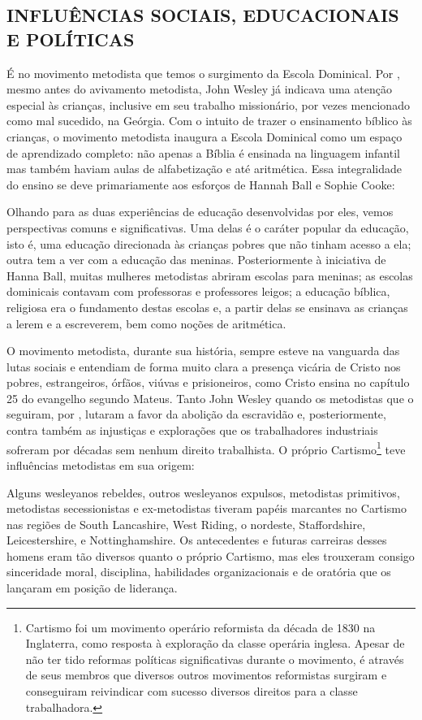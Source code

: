 \documentclass[
    article,            %
	12pt,				%
	oneside,			%
	a4paper,			%
	chapter=TITLE,		%
	section=TITLE,		%
	english,			%
	french,				%
	spanish,			%
	brazil				%
	]{abntex2}
\begin{document}
\subsection{INFLUÊNCIAS SOCIAIS, EDUCACIONAIS E POLÍTICAS}
É no movimento metodista que temos o surgimento da Escola Dominical. Por , mesmo antes do avivamento metodista, John Wesley já indicava uma atenção especial às crianças, inclusive em seu trabalho missionário, por vezes mencionado como mal sucedido, na Geórgia. Com o intuito de trazer o ensinamento bíblico às crianças, o movimento metodista inaugura a Escola Dominical como um espaço de aprendizado completo: não apenas a Bíblia é ensinada na linguagem infantil mas também haviam aulas de alfabetização e até aritmética. Essa integralidade do ensino se deve primariamente aos esforços de Hannah Ball e Sophie Cooke:
\begin{citacao}
Olhando para as duas experiências de educação desenvolvidas por eles, vemos perspectivas comuns e significativas. Uma delas é o caráter popular da educação, isto é, uma educação direcionada às crianças pobres que não tinham acesso a ela; outra tem a ver com a educação das meninas. Posteriormente à iniciativa de Hanna Ball, muitas mulheres metodistas abriram escolas para meninas; as escolas dominicais contavam com professoras e professores leigos; a educação bíblica, religiosa era o fundamento destas escolas e, a partir delas se ensinava as crianças a lerem e a escreverem, bem como noções de aritmética. \cite{FERNANDES}
\end{citacao}

O movimento metodista, durante sua história, sempre esteve na vanguarda das lutas sociais e entendiam de forma muito clara a presença vicária de Cristo nos pobres, estrangeiros, órfãos, viúvas e prisioneiros, como Cristo ensina no capítulo 25 do evangelho segundo Mateus. Tanto John Wesley quando os metodistas que o seguiram, por , lutaram a favor da abolição da escravidão e, posteriormente, contra também as injustiças e explorações que os trabalhadores industriais sofreram por décadas sem nenhum direito trabalhista. O próprio Cartismo\footnote{Cartismo foi um movimento operário reformista da década de 1830 na Inglaterra, como resposta à exploração da classe operária inglesa. Apesar de não ter tido reformas políticas significativas durante o movimento, é através de seus membros que diversos outros movimentos reformistas surgiram e conseguiram reivindicar com sucesso diversos direitos para a classe trabalhadora.} teve influências metodistas em sua origem:
\begin{citacao}
Alguns wesleyanos rebeldes, outros wesleyanos expulsos, metodistas primitivos, metodistas secessionistas e ex-metodistas tiveram papéis marcantes no Cartismo nas regiões de South Lancashire, West Riding, o nordeste, Staffordshire, Leicestershire, e Nottinghamshire. Os antecedentes e futuras carreiras desses homens eram tão diversos quanto o próprio Cartismo, mas eles trouxeram consigo sinceridade moral, disciplina, habilidades organizacionais e de oratória que os lançaram em posição de liderança. \cite[p.106, tradução nossa]{HEMPTON}
\end{citacao}
\end{document}
